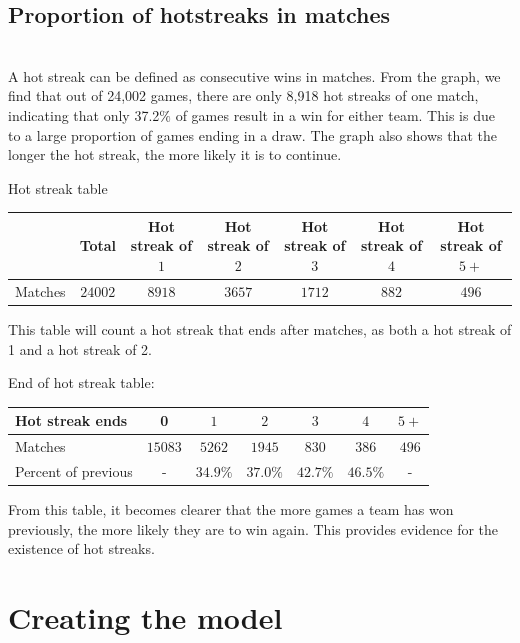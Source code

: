 \documentclass{article}
\begin{document}
\subsection{Proportion of hotstreaks in matches}
\\[19\baselineskip]
A hot streak can be defined as consecutive wins in matches. From the graph, we find that out of 24,002 games, there are only 8,918 hot streaks of one match, indicating that only 37.2$\%$ of games result in a win for either team. This is due to a large proportion of games ending in a draw. The graph also shows that the longer the hot streak, the more likely it is to continue.
\begin{center}
Hot streak table
\begin{tabular}{lcccccc}
\hline
    &Total&Hot streak of $1$&Hot streak of $2$&Hot streak of $3$&Hot streak of $4$&Hot streak of $5+$\\
\hline
    Matches&$24002$&$8918$&$3657$&$1712$&$882$&$496$\\  
\hline
\end{tabular}
\end{center}
\vspace{8mm}
This table will count a hot streak that ends after matches, as both a hot streak of 1 and a hot streak of 2.
\vspace{8mm}
\begin{center}
End of hot streak table:
\begin{tabular}{lcccccc}
\hline
    Hot streak ends&0&$1$&$2$&$3$&$4$&$5+$\\
\hline
    Matches&$15083$&$5262$&$1945$&$830$&$386$&$496$\\
    Percent of previous&-&$34.9\%$&$37.0\%$&$42.7\%$&$46.5\%$&-\\
\hline
\end{tabular}
\end{center}
From this table, it becomes clearer that the more games a team has won previously, the more likely they are to win again. This provides evidence for the existence of hot streaks.
\newpage
\section{Creating the model}\label{sec:further}
\end{document}
